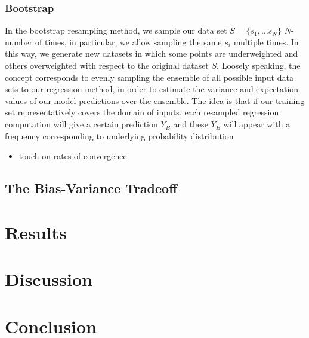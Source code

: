 \documentclass[reprint, english, nofootinbib]{revtex4-2}
\begin{document}
        \subsubsection{Bootstrap}
            \noindent
            In the bootstrap resampling method, we sample our data set $S = \{s_1, \dots s_N\}$ $N$-number of times, in particular, we allow sampling the same $s_i$ multiple times. In this way, we generate new datasets in which some points are underweighted and others overweighted with respect to the original dataset $S$. Loosely speaking, the concept corresponds to evenly sampling the ensemble of all possible input data sets to our regression method, in order to estimate the variance and expectation values of our model predictions over the ensemble. The idea is that if our training set representatively covers the domain of inputs, each resampled regression computation will give a certain prediction $\tilde{Y_{B}}$ and these $\tilde{Y_{B}}$ will appear with a frequency corresponding to underlying probability distribution 
            
            \begin{itemize}
                \item touch on rates of convergence
            \end{itemize}

    \subsection{The Bias-Variance Tradeoff}

\section{Results}

\section{Discussion}

\section{Conclusion}

\onecolumngrid

\newpage
\twocolumngrid
\appendix
\end{document}
